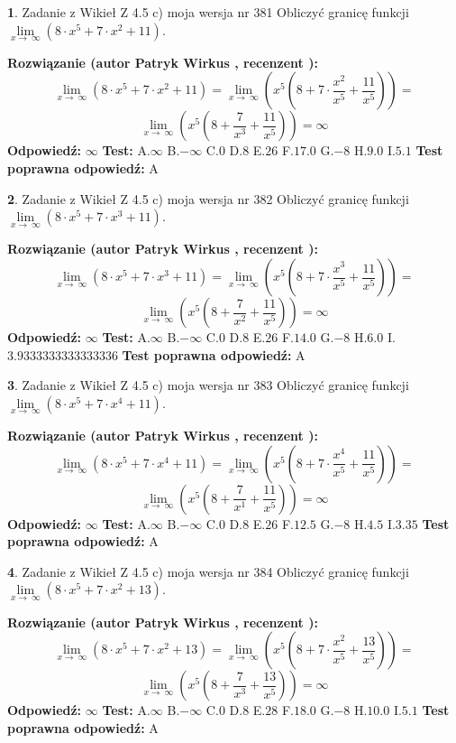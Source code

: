 \documentclass[12pt, a4paper]{article}
\theoremstyle{definition} %
\newtheorem{zad}{}
\newcommand{\zadStart}[1]{\begin{zad}#1\newline}
\newcommand{\zadStop}{\end{zad}}
\newcommand{\rozwStart}[2]{\noindent \textbf{Rozwiązanie (autor #1 , recenzent #2): }\newline}
\newcommand{\rozwStop}{\newline}
\newcommand{\odpStart}{\noindent \textbf{Odpowiedź:}\newline}
\newcommand{\odpStop}{\newline}
\newcommand{\testStart}{\noindent \textbf{Test:}\newline}
\newcommand{\testStop}{\newline}
\newcommand{\kluczStart}{\noindent \textbf{Test poprawna odpowiedź:}\newline}
\newcommand{\kluczStop}{\newline}
\begin{document}
\zadStart{Zadanie z Wikieł Z 4.5 c) moja wersja nr 381}
Obliczyć granicę funkcji  $\lim\limits_{x\to\ \infty}(8 \cdot x^{5}+7 \cdot x^{2}+11)$.
\zadStop
\rozwStart{Patryk Wirkus}{}
$$\lim\limits_{x\to\ \infty}(8 \cdot x^{5}+7 \cdot x^{2}+11) = \lim\limits_{x\to\ \infty}(x^{5}(8 +7 \cdot \frac{x^{2}}{x^{5}}+\frac{11}{x^{5}})) =$$ $$\lim\limits_{x\to\ \infty}(x^{5}(8 +\frac{7}{x^{3}}+\frac{11}{x^{5}})) =\infty$$
\rozwStop
\odpStart
$\infty$
\odpStop
\testStart
A.$\infty$ B.$-\infty$ C.$0$ D.$8$ E.$26$
F.$17.0$ G.$-8$
H.$9.0$
I.$5.1$
\testStop
\kluczStart
A
\kluczStop



\zadStart{Zadanie z Wikieł Z 4.5 c) moja wersja nr 382}
Obliczyć granicę funkcji  $\lim\limits_{x\to\ \infty}(8 \cdot x^{5}+7 \cdot x^{3}+11)$.
\zadStop
\rozwStart{Patryk Wirkus}{}
$$\lim\limits_{x\to\ \infty}(8 \cdot x^{5}+7 \cdot x^{3}+11) = \lim\limits_{x\to\ \infty}(x^{5}(8 +7 \cdot \frac{x^{3}}{x^{5}}+\frac{11}{x^{5}})) =$$ $$\lim\limits_{x\to\ \infty}(x^{5}(8 +\frac{7}{x^{2}}+\frac{11}{x^{5}})) =\infty$$
\rozwStop
\odpStart
$\infty$
\odpStop
\testStart
A.$\infty$ B.$-\infty$ C.$0$ D.$8$ E.$26$
F.$14.0$ G.$-8$
H.$6.0$
I.$3.9333333333333336$
\testStop
\kluczStart
A
\kluczStop



\zadStart{Zadanie z Wikieł Z 4.5 c) moja wersja nr 383}
Obliczyć granicę funkcji  $\lim\limits_{x\to\ \infty}(8 \cdot x^{5}+7 \cdot x^{4}+11)$.
\zadStop
\rozwStart{Patryk Wirkus}{}
$$\lim\limits_{x\to\ \infty}(8 \cdot x^{5}+7 \cdot x^{4}+11) = \lim\limits_{x\to\ \infty}(x^{5}(8 +7 \cdot \frac{x^{4}}{x^{5}}+\frac{11}{x^{5}})) =$$ $$\lim\limits_{x\to\ \infty}(x^{5}(8 +\frac{7}{x^{1}}+\frac{11}{x^{5}})) =\infty$$
\rozwStop
\odpStart
$\infty$
\odpStop
\testStart
A.$\infty$ B.$-\infty$ C.$0$ D.$8$ E.$26$
F.$12.5$ G.$-8$
H.$4.5$
I.$3.35$
\testStop
\kluczStart
A
\kluczStop



\zadStart{Zadanie z Wikieł Z 4.5 c) moja wersja nr 384}
Obliczyć granicę funkcji  $\lim\limits_{x\to\ \infty}(8 \cdot x^{5}+7 \cdot x^{2}+13)$.
\zadStop
\rozwStart{Patryk Wirkus}{}
$$\lim\limits_{x\to\ \infty}(8 \cdot x^{5}+7 \cdot x^{2}+13) = \lim\limits_{x\to\ \infty}(x^{5}(8 +7 \cdot \frac{x^{2}}{x^{5}}+\frac{13}{x^{5}})) =$$ $$\lim\limits_{x\to\ \infty}(x^{5}(8 +\frac{7}{x^{3}}+\frac{13}{x^{5}})) =\infty$$
\rozwStop
\odpStart
$\infty$
\odpStop
\testStart
A.$\infty$ B.$-\infty$ C.$0$ D.$8$ E.$28$
F.$18.0$ G.$-8$
H.$10.0$
I.$5.1$
\testStop
\kluczStart
A
\kluczStop
\end{document}
